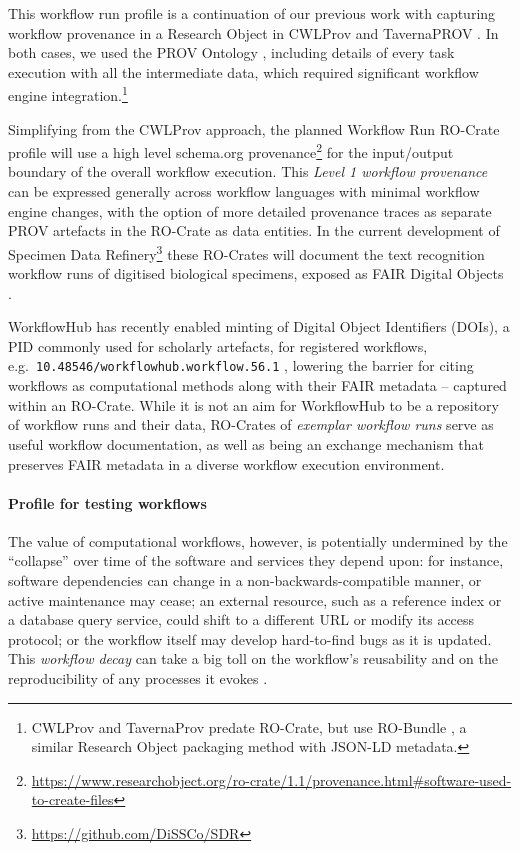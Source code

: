 This workflow run profile is a continuation of our previous work with
capturing workflow provenance in a Research Object in CWLProv
\cite{Khan 2019} and
TavernaPROV \cite{Soiland-Reyes 2016}.
In both cases, we used the PROV Ontology
\cite{w3-prov-o},
including details of every task execution with all the intermediate
data, which required significant workflow engine integration.\footnote{CWLProv
  and TavernaProv predate RO-Crate, but use RO-Bundle
  \cite{ch5-111}, a similar
  Research Object packaging method with JSON-LD metadata.}

Simplifying from the CWLProv approach, the planned Workflow Run RO-Crate
profile will use a high level schema.org
provenance\footnote{\url{https://www.researchobject.org/ro-crate/1.1/provenance.html\#software-used-to-create-files}}
for the input/output boundary of the overall workflow
execution. This \emph{Level 1 workflow provenance}
\cite{Khan 2019} can be
expressed generally across workflow languages with minimal workflow
engine changes, with the option of more detailed provenance traces as
separate PROV artefacts in the RO-Crate as data entities. In the current
development of Specimen Data
Refinery\footnote{\url{https://github.com/DiSSCo/SDR}} \cite{Walton 2020} these
RO-Crates will document the text recognition workflow runs of digitised
biological specimens, exposed as FAIR Digital Objects
\cite{De Smedt 2020}.

WorkflowHub has recently enabled minting of Digital Object Identifiers
(DOIs), a PID commonly used for scholarly artefacts, for registered
workflows, e.g.~\texttt{10.48546/workflowhub.workflow.56.1}
\cite{ch5-83},
lowering the barrier for citing workflows as computational methods along
with their FAIR metadata -- captured within an RO-Crate. While it is not
an aim for WorkflowHub to be a repository of workflow runs and their
data, RO-Crates of \emph{exemplar workflow runs} serve as useful
workflow documentation, as well as being an exchange mechanism that
preserves FAIR metadata in a diverse workflow execution environment.

\paragraph{Profile for testing workflows}\label{ch5:profile-for-testing-workflows}

The value of computational workflows, however, is potentially undermined
by the ``collapse'' over time of the software and services they depend
upon: for instance, software dependencies can change in a
non-backwards-compatible manner, or active maintenance may cease; an
external resource, such as a reference index or a database query
service, could shift to a different URL or modify its access protocol;
or the workflow itself may develop hard-to-find bugs as it is updated.
This \emph{workflow decay} can take a big toll on the workflow's
reusability and on the reproducibility of any processes it evokes
\cite{ch5-125}.

